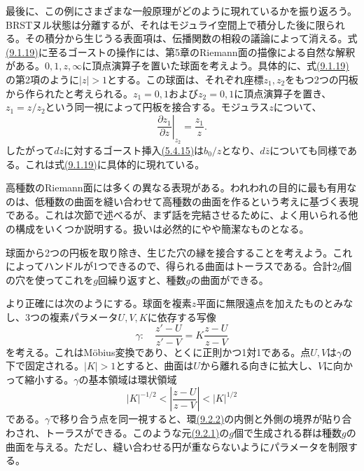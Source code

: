 最後に、この例にさまざまな一般原理がどのように現れているかを振り返ろう。BRSTヌル状態は分離するが、それはモジュライ空間上で積分した後に限られる。その積分から生じうる表面項は、伝播関数の相殺の議論によって消える。式\hyperref[eq:9.1.19]{(9.1.19)}に至るゴーストの操作には、第5章のRiemann面の描像による自然な解釈がある。$0,1,z,\infty$に頂点演算子を置いた球面を考えよう。具体的に、式\hyperref[eq:9.1.19]{(9.1.19)}の第2項のように$|z|>1$とする。この球面は、それぞれ座標$z_1,z_2$をもつ2つの円板から作られたと考えられる。$z_1=0,1$および$z_2=0,1$に頂点演算子を置き、$z_1=z/z_2$という同一視によって円板を接合する。モジュラス$z$について、
\begin{equation}
 \left.\frac{\partial z_1}{\partial z}\right|_{z_2}=\frac{z_1}{z}.
 \tag{9.1.34}\label{eq:9.1.34}
\end{equation}
したがって$dz$に対するゴースト挿入\hyperref[eq:5.4.15]{(5.4.15)}は$b_0/z$となり、$d\bar z$についても同様である。これは式\hyperref[eq:9.1.19]{(9.1.19)}に具体的に現れている。

\label{sec:9.2}
高種数のRiemann面には多くの異なる表現がある。われわれの目的に最も有用なのは、低種数の曲面を縫い合わせて高種数の曲面を作るという考えに基づく表現である。これは次節で述べるが、まず話を完結させるために、よく用いられる他の構成をいくつか説明する。扱いは必然的にやや簡潔なものとなる。

球面から2つの円板を取り除き、生じた穴の縁を接合することを考えよう。これによってハンドルが1つできるので、得られる曲面はトーラスである。合計$2g$個の穴を使ってこれを$g$回繰り返すと、種数$g$の曲面ができる。

より正確には次のようにする。球面を複素$z$平面に無限遠点を加えたものとみなし、3つの複素パラメータ$U,V,K$に依存する写像
\begin{equation}
 \gamma:\quad\frac{z'-U}{z'-V}=K\frac{z-U}{z-V}
 \tag{9.2.1}\label{eq:9.2.1}
\end{equation}
を考える。これはMöbius変換であり、とくに正則かつ1対1である。点$U,V$は$\gamma$の下で固定される。$|K|>1$とすると、曲面は$U$から離れる向きに拡大し、$V$に向かって縮小する。$\gamma$の基本領域は環状領域
\begin{equation}
 |K|^{-1/2}<\left|\frac{z-U}{z-V}\right|<|K|^{1/2}
 \tag{9.2.2}\label{eq:9.2.2}
\end{equation}
である。$\gamma$で移り合う点を同一視すると、環\hyperref[eq:9.2.2]{(9.2.2)}の内側と外側の境界が貼り合わされ、トーラスができる。このような元\hyperref[eq:9.2.1]{(9.2.1)}の$g$個で生成される群は種数$g$の曲面を与える。ただし、縫い合わせる円が重ならないようにパラメータを制限する。

